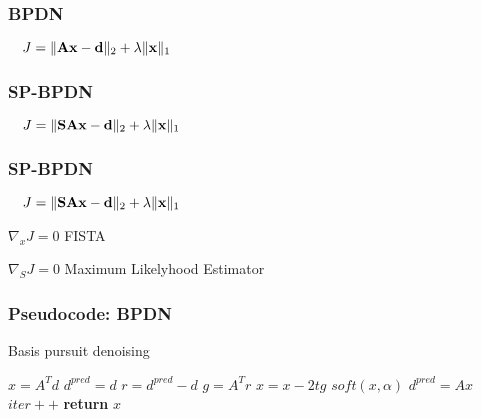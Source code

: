\begin{frame} \frametitle{BPDN}
\begin{center}
$
\quad{J}=\| {\bf{A}} {\bf{x}} - {\bf{d}} \|_2 + \lambda\|{\bf{x}}\|_1
$ 
\end{center}
\end{frame}

\begin{frame} \frametitle{SP-BPDN}
\begin{center}
$
\quad{J}=\| {\bf{S}}{\bf{A}} {\bf{x}} - {\bf{d}} \|_2 + \lambda\|{\bf{x}}\|_1
$ 
\end{center}
\end{frame}

\begin{frame} \frametitle{SP-BPDN}
\begin{center}
$
\quad{J}=\| {\bf{S}}{\bf{A}} {\bf{x}} - {\bf{d}} \|_2 + \lambda\|{\bf{x}}\|_1
$

\vspace{1cm}

$\nabla_xJ=0$ FISTA

\vspace{1cm}

$\nabla_SJ=0$ Maximum Likelyhood Estimator

\end{center}
\end{frame}

\begin{frame} \frametitle{Pseudocode: BPDN}
\begin{algorithm}[H]
\renewcommand{\thealgorithm}{}
\tiny
\caption{Basis pursuit denoising}\label{BPDN}
\begin{algorithmic}
   \State $x=A^Td$ 
   \State $d^{pred}=d$ 
      \State $r=d^{pred} - d$ 
      \State $g=A^Tr$
      \State $x = x - 2tg$
      \State $soft(x,\alpha)$
      \State $d^{pred} = Ax$
      \State $iter++$
   \EndWhile
   \State \textbf{return} $x$
\EndProcedure
\end{algorithmic}
\end{algorithm}
\end{frame}

 {\color{red}}

